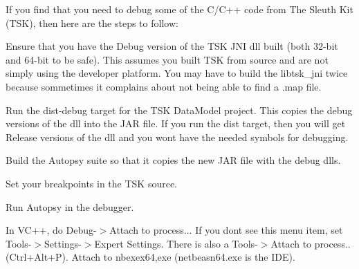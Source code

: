 If you find that you need to debug some of the C/\+C++ code from The Sleuth Kit (T\+SK), then here are the steps to follow\+:


\begin{DoxyEnumerate}
\item Ensure that you have the Debug version of the T\+SK J\+NI dll built (both 32-\/bit and 64-\/bit to be safe). This assumes you built T\+SK from source and are not simply using the developer platform. You may have to build the libtsk\+\_\+jni twice because sommetimes it complains about not being able to find a .map file.
\item Run the \textquotesingle{}dist-\/debug\textquotesingle{} target for the T\+SK Data\+Model project. This copies the debug versions of the dll into the J\+AR file. If you run the \textquotesingle{}dist\textquotesingle{} target, then you will get Release versions of the dll and you won\textquotesingle{}t have the needed symbols for debugging.
\item Build the Autopsy suite so that it copies the new J\+AR file with the debug dlls.
\item Set your breakpoints in the T\+SK source.
\item Run Autopsy in the debugger.
\item In V\+C++, do Debug-\/$>$Attach to process... If you don\textquotesingle{}t see this menu item, set Tools-\/$>$Settings-\/$>$Expert Settings. There is also a Tools-\/$>$Attach to process..(Ctrl+\+Alt+P). Attach to nbexex64,exe (netbeasn64.\+exe is the I\+DE). 
\end{DoxyEnumerate}